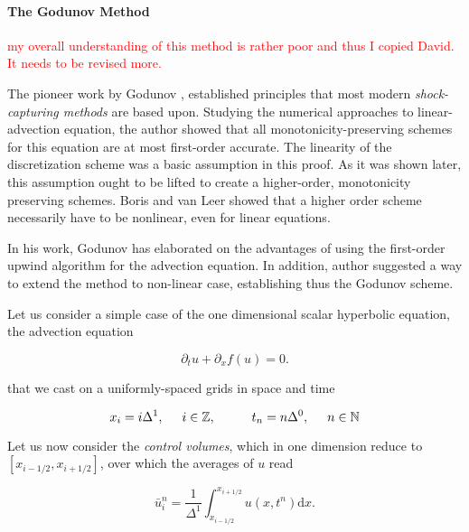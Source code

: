 \paragraph{The Godunov Method}


\textcolor{red}{my overall understanding of this method is rather poor and thus I copied David. It needs to be revised more.}

The pioneer work by Godunov \cite{Godunov:1959}, established principles that most modern  \textit{shock-capturing methods} are based upon. 
Studying the numerical approaches to linear-advection equation, the author showed that all monotonicity-preserving schemes for this equation are at most first-order accurate. 
The linearity of the discretization scheme was a basic assumption in this proof. 
As it was shown later, this assumption ought to be lifted to create a higher-order, monotonicity preserving schemes. 
Boris \cite{Boris:1971} and van Leer \cite{vanLeer:1973} showed that a higher order scheme necessarily have to be nonlinear, even for linear equations.

In his work, Godunov has elaborated on the advantages of using the first-order upwind algorithm for the advection equation. 
In addition, author suggested a way to extend the method to non-linear case, establishing thus the Godunov scheme.

Let us consider a simple case of the one dimensional scalar hyperbolic equation, the advection equation

\begin{equation}
\partial_t u + \partial_x f(u) = 0.
\label{eq:theory:fv:adveq}
\end{equation}

that we cast on a uniformly-spaced grids in space and time 

\begin{equation}
x_i = i\Delta^1, \hspace{5mm} i\in\mathbb{Z}, \hspace{10mm} t_n = n\Delta^0, \hspace{5mm} n\in\mathbb{N}
\end{equation}

Let us now consider the \textit{control volumes}, which in one dimension reduce to $[x_{i-1/2},x_{i+1/2}]$, over which the averages of $u$ read

\begin{equation}
\bar{u}_i ^n = \frac{1}{\Delta^1}\int_{x_{i-1/2}}^{x_{i + 1/2}} u(x, t^n) \text{d}x.
\end{equation}

